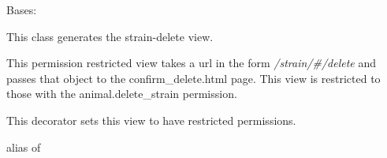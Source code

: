 \documentclass[letterpaper,10pt,english]{sphinxmanual}
\begin{document}
\begin{fulllineitems}
\label{api:mousedb.animal.views.StrainDelete}
Bases: \href{http://docs.djangoproject.com/en/dev/ref/class-based-views/\#django.views.generic.edit.DeleteView}{}

This class generates the strain-delete view.

This permission restricted view takes a url in the form \emph{/strain/\#/delete} and passes that object to the confirm\_delete.html page.
This view is restricted to those with the animal.delete\_strain permission.


\begin{fulllineitems}
\label{api:mousedb.animal.views.StrainDelete.dispatch}
This decorator sets this view to have restricted permissions.

\end{fulllineitems}



\begin{fulllineitems}
\label{api:mousedb.animal.views.StrainDelete.model}
alias of 

\end{fulllineitems}


\end{fulllineitems}


\end{document}
